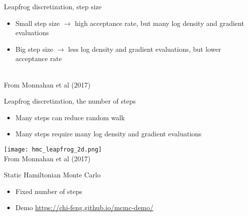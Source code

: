 \documentclass[finnish,english,t]{beamer}
\begin{document}
\begin{frame}{Leapfrog discretization, step size}

  \vspace{-0.5\baselineskip}
  \begin{itemize}
    \item Small step size $\rightarrow$ high acceptance rate, but many
      log density and gradient evaluations
    \item Big step size $\rightarrow$ less log density and gradient
      evaluations, but lower acceptance rate 
    \end{itemize}
  \\
  {\footnotesize From Monnahan et al (2017)}
\end{frame}

\begin{frame}{Leapfrog discretization, the number of steps}

    \begin{itemize}
    \item Many steps can reduce random walk
    \item Many steps require many log density and gradient evaluations
    \end{itemize}
    \vspace{20.5pt}
    {\texttt{[image: hmc\_leapfrog\_2d.png]}}\\
  {\footnotesize From Monnahan et al (2017)}
\end{frame}
  
\begin{frame}{Static Hamiltonian Monte Carlo}

  \begin{itemize}
  \item Fixed number of steps
  \item Demo \url{https://chi-feng.github.io/mcmc-demo/}
  \end{itemize}

\end{frame}
\end{document}
